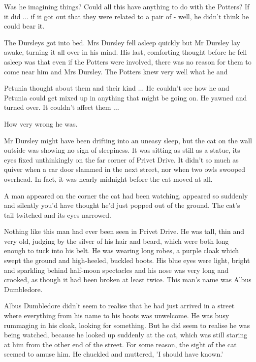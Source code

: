 \documentclass[twoside, openany]{report}
\begin{document}
Was he imagining things? Could all this have anything to do 
with the Potters? If it did ... if it got out that they were related to a 
pair of - well, he didn't think he could bear it. 

The Dursleys got into bed. Mrs Dursley fell asleep quickly but 
Mr Dursley lay awake, turning it all over in his mind. His last, 
comforting thought before he fell asleep was that even if the 
Potters were involved, there was no reason for them to come near 
him and Mrs Dursley. The Potters knew very well what he and 



Petunia thought about them and their kind ... He couldn't see how 
he and Petunia could get mixed up in anything that might be 
going on. He yawned and turned over. It couldn't affect them ... 

How very wrong he was. 

Mr Dursley might have been drifting into an uneasy sleep, but 
the cat on the wall outside was showing no sign of sleepiness. It 
was sitting as still as a statue, its eyes fixed unthinkingly on the 
far corner of Privet Drive. It didn't so much as quiver when a car 
door slammed in the next street, nor when two owls swooped 
overhead. In fact, it was nearly midnight before the cat moved at all. 

A man appeared on the corner the cat had been watching, 
appeared so suddenly and silently you'd have thought he'd just 
popped out of the ground. The cat's tail twitched and its eyes 
narrowed. 

Nothing like this man had ever been seen in Privet Drive. He 
was tall, thin and very old, judging by the silver of his hair and 
beard, which were both long enough to tuck into his belt. He was 
wearing long robes, a purple cloak which swept the ground and 
high-heeled, buckled boots. His blue eyes were light, bright and 
sparkling behind half-moon spectacles and his nose was very long 
and crooked, as though it had been broken at least twice. This 
man's name was Albus Dumbledore. 

Albus Dumbledore didn't seem to realise that he had just 
arrived in a street where everything from his name to his boots 
was unwelcome. He was busy rummaging in his cloak, looking for 
something. But he did seem to realise he was being watched, 
because he looked up suddenly at the cat, which was still staring 
at him from the other end of the street. For some reason, the sight 
of the cat seemed to amuse him. He chuckled and muttered, 'I 
should have known.' 
\end{document}
